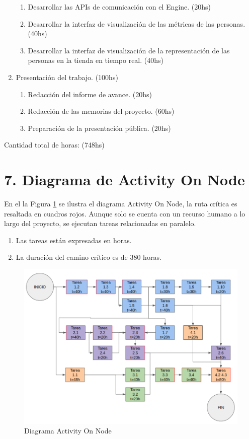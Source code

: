 \documentclass[11pt]{charter}
\begin{document}
\begin{enumerate}
\begin{enumerate}
	\item Desarrollar las APIs de comunicación con el Engine. (20hs)
	\item Desarrollar la interfaz de visualización de las métricas de las personas. (40hs)
	\item Desarrollar la interfaz de visualización de la representación de las personas en la tienda en tiempo real. (40hs)
	\end{enumerate}
\item Presentación del trabajo. (100hs)
	\begin{enumerate}
	\item Redacción del informe de avance. (20hs)
	\item Redacción de las memorias del proyecto. (60hs)
	\item Preparación de la presentación pública. (20hs)
	\end{enumerate}
\end{enumerate}

Cantidad total de horas: (748hs)

\newpage

\section{7. Diagrama de Activity On Node}
\label{sec:AoN}

En el la Figura \ref{fig:diagAoN} se ilustra el diagrama Activity On Node, la ruta crítica es resaltada en cuadros rojos. Aunque solo se cuenta con un recurso humano a lo largo del proyecto, se ejecutan tareas relacionadas en paralelo.
\begin{enumerate}
\item Las tareas están expresadas en horas.
\item La duración del camino crítico es de 380 horas.
\end{enumerate}

\begin{figure}[htpb]
\centering 
\includegraphics[width=1.\textwidth]{./Figuras/diagAoN.png}
\caption{Diagrama Activity On Node}
\label{fig:diagAoN}
\end{figure}
\end{document}
